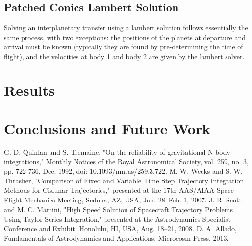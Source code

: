\documentclass[conference]{IEEEtran}
\begin{document}
	\subsection{Patched Conics Lambert Solution}
	Solving an interplanetary transfer using a lambert solution follows essentially the same process, with two exceptions: the positions of the planets at departure and arrival must be known (typically they are found by pre-determining the time of flight), and the velocities at body 1 and body 2 are given by the lambert solver. 
	
	\section{Results}
	
	\section{Conclusions and Future Work}
	
	\begin{thebibliography}{00}
		 G. D. Quinlan and S. Tremaine, "On the reliability of gravitational N-body integrations," Monthly Notices of the Royal Astronomical Society, vol. 259, no. 3, pp. 722-736, Dec. 1992, doi: 10.1093/mnras/259.3.722.
		 M. W. Weeks and S. W. Thrasher, "Comparison of Fixed and Variable Time Step Trajectory Integration Methods for Cislunar Trajectories," presented at the 17th AAS/AIAA Space Flight Mechanics Meeting, Sedona, AZ, USA, Jan. 28–Feb. 1, 2007.
		 J. R. Scott and M. C. Martini, "High Speed Solution of Spacecraft Trajectory Problems Using Taylor Series Integration," presented at the Astrodynamics Specialist Conference and Exhibit, Honolulu, HI, USA, Aug. 18–21, 2008.
		 D. A. Allado, Fundamentals of Astrodynamics and Applications. Microcosm Press, 2013.
		
	\end{thebibliography}
	
\end{document}
